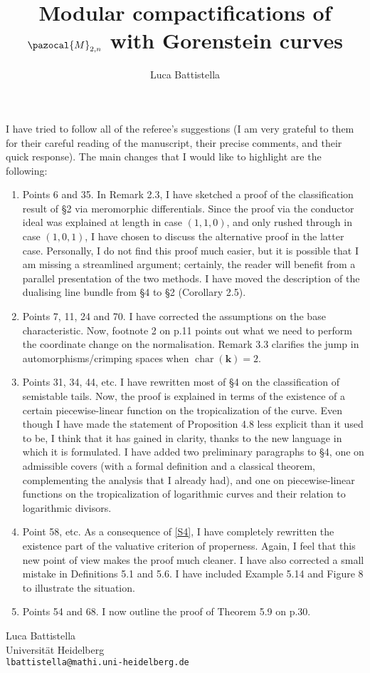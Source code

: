 \documentclass[11pt]{amsart}
\title[Modular compactifications of $\pazocal{M}_{2,n}$]{\small{Modular compactifications of $\pazocal{M}_{2,n}$ with Gorenstein curves}}
\author{Luca Battistella}
\theoremstyle{plain}
\theoremstyle{definition}
\begin{document}
\maketitle

I have tried to follow all of the referee's suggestions (I am very grateful to them for their careful reading of the manuscript, their precise comments, and their quick response). The main changes that I would like to highlight are the following:
\begin{enumerate}[leftmargin=.5cm]
 \item Points 6 and 35. In Remark 2.3, I have sketched a proof of the classification result of \S 2 via meromorphic differentials. Since the proof via the conductor ideal was explained at length in case $(1,1,0)$, and only rushed through in case $(1,0,1)$, I have chosen to discuss the alternative proof in the latter case. Personally, I do not find this proof much easier, but it is possible that I am missing a streamlined argument; certainly, the reader will benefit from a parallel presentation of the two methods. I have moved the description of the dualising line bundle from \S 4 to \S 2 (Corollary 2.5).
 
 \item Points 7, 11, 24 and 70. I have corrected the assumptions on the base characteristic. Now, footnote 2 on p.11 points out what we need to perform the coordinate change on the normalisation. Remark 3.3 clarifies the jump in automorphisms/crimping spaces when $\operatorname{char}(\mathbf k)=2$.
 
 \item\label{S4} Points 31, 34, 44, etc. I have rewritten most of \S 4 on the classification of semistable tails. Now, the proof is explained in terms of the existence of a certain piecewise-linear function on the tropicalization of the curve. Even though I have made the statement of Proposition 4.8 less explicit than it used to be, I think that it has gained in clarity, thanks to the new language in which it is formulated. I have added two preliminary paragraphs to \S 4, one on admissible covers (with a formal definition and a classical theorem, complementing the analysis that I already had), and one on piecewise-linear functions on the tropicalization of logarithmic curves and their relation to logarithmic divisors.
 
 \item Point 58, etc. As a consequence of \eqref{S4}, I have completely rewritten the existence part of the valuative criterion of properness. Again, I feel that this new point of view makes the proof much cleaner. I have also corrected a small mistake in Definitions 5.1 and 5.6. I have included Example 5.14 and Figure 8 to illustrate the situation.
 
 \item Points 54 and 68. I now outline the proof of Theorem 5.9 on p.30.
 
\end{enumerate}

\medskip

\noindent Luca Battistella\\
Universit\"at Heidelberg \\
\texttt{lbattistella@mathi.uni-heidelberg.de}\\
\end{document}
